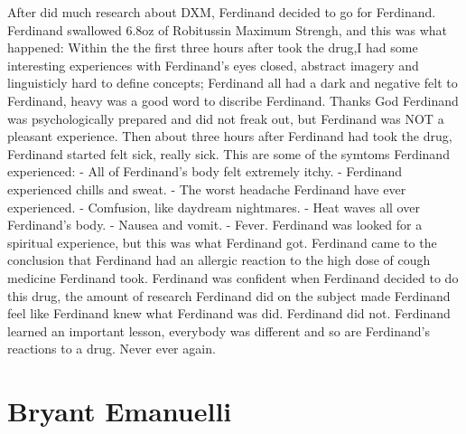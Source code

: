 \documentclass[12pt]{book}
\begin{document}
After did much research about DXM, Ferdinand decided to go for Ferdinand. Ferdinand swallowed 6.8oz of Robitussin Maximum Strengh, and this was what happened: Within the the first three hours after took the drug,I had some interesting experiences with Ferdinand's eyes closed, abstract imagery and linguisticly hard to define concepts; Ferdinand all had a dark and negative felt to Ferdinand, heavy was a good word to discribe Ferdinand. Thanks God Ferdinand was psychologically prepared and did not freak out, but Ferdinand was NOT a pleasant experience. Then about three hours after Ferdinand had took the drug, Ferdinand started felt sick, really sick. This are some of the symtoms Ferdinand experienced: - All of Ferdinand's body felt extremely itchy. - Ferdinand experienced chills and sweat. - The worst headache Ferdinand have ever experienced. - Comfusion, like daydream nightmares. - Heat waves all over Ferdinand's body. - Nausea and vomit. - Fever. Ferdinand was looked for a spiritual experience, but this was what Ferdinand got. Ferdinand came to the conclusion that Ferdinand had an allergic reaction to the high dose of cough medicine Ferdinand took. Ferdinand was confident when Ferdinand decided to do this drug, the amount of research Ferdinand did on the subject made Ferdinand feel like Ferdinand knew what Ferdinand was did. Ferdinand did not. Ferdinand learned an important lesson, everybody was different and so are Ferdinand's reactions to a drug. Never ever again.



\chapter{Bryant Emanuelli}
\end{document}
